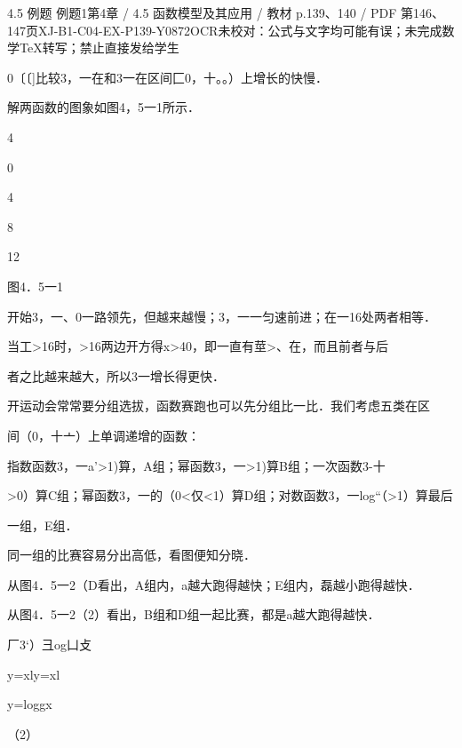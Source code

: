 \begin{bankitem}{4.5 例题 例题1}{第4章 / 4.5 函数模型及其应用 / 教材 p.139、140 / PDF 第146、147页}{XJ-B1-C04-EX-P139-Y0872}{OCR未校对：公式与文字均可能有误；未完成数学TeX转写；禁止直接发给学生}
\begin{ocrdraft}
\par
0〔〔]比较3，一在和3一在区间匚0，十。。）上增长的快慢．
\par
解两函数的图象如图4，5一1所示．
\par
4
\par
0
\par
4
\par
8
\par
12
\par
图4．5一1
\par
开始3，一、0一路领先，但越来越慢；3，一一匀速前进；在一16处两者相等．
\par
当工>16时，>16两边开方得x>40，即一直有莖>、在，而且前者与后
\par
者之比越来越大，所以3一增长得更快．
\par
开运动会常常要分组选拔，函数赛跑也可以先分组比一比．我们考虑五类在区
\par
间（0，十亠）上单调递增的函数：
\par
指数函数3，一a'>1)算，A组；幂函数3，一>1)算B组；一次函数3-十
\par
>0）算C组；幂函数3，一的（0<仅<1）算D组；对数函数3，一log“（>1）算最后
\par
[教材p.140 / PDF第147页]
\par
一组，E组．
\par
同一组的比赛容易分出高低，看图便知分晓．
\par
从图4．5一2（D看出，A组内，a越大跑得越快；E组内，磊越小跑得越快．
\par
从图4．5一2（2）看出，B组和D组一起比赛，都是a越大跑得越快．
\par
厂3`）彐og凵攴
\par
y=xly=xl
\par
y=loggx
\par
（2）
\par

\end{ocrdraft}
\end{bankitem}

